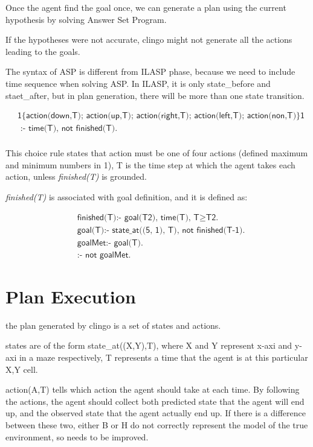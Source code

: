 Once the agent find the goal once, we can generate a plan using the current hypothesis by solving Answer Set Program. 

If the hypotheses were not accurate, clingo might not generate all the actions leading to the goals. 

The syntax of ASP is different from ILASP phase, because we need to include time sequence when solving ASP.
In ILASP, it is only state\_before and staet\_after, but in plan generation, there will be more than one state transition. 

\begin{equation}
\begin{split}
&\textsf{1\{action(down,T); action(up,T); action(right,T); action(left,T); action(non,T)\}1} \\
&\textsf{ :- time(T), not finished(T).}\\
\end{split}
\end{equation}

This choice rule states that action must be one of four actions (defined maximum and minimum numbers in 1), 
T is the time step at which the agent takes each action, unless \textit{finished(T)} is grounded. 

\textit{finished(T)} is associated with goal definition, and it is defined as:

\begin{equation}
\begin{split}
&\textsf{finished(T):- goal(T2), time(T), T} \geq \textsf{T2.}\\
&\textsf{goal(T):- state\_at((5, 1), T), not finished(T-1).}\\
&\textsf{goalMet:- goal(T).}\\
&\textsf{:- not goalMet.}
\end{split}
\end{equation}
    
\section{Plan Execution}
\label{Plan execution}

the plan generated by clingo is a set of states and actions. 

states are of the form state\_at((X,Y),T), where X and Y represent x-axi and y-axi in a maze respectively, T represents a time that the agent is at 
this particular X,Y cell. 

action(A,T) tells which action the agent should take at each time. By following the actions, the agent should collect both predicted state that the 
agent will end up, and the observed state that the agent actually end up. If there is a difference between these two, either B or H do not correctly represent
the model of the true environment, so needs to be improved. 

